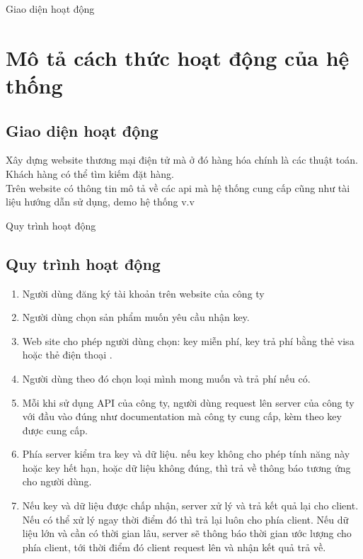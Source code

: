 \documentclass{beamer}
\begin{document}
\begin{frame}{Giao diện hoạt động}
\section{Mô tả cách thức hoạt động của hệ thống}
\subsection{Giao diện hoạt động}
Xây dựng website thương mại điện tử mà ở đó hàng hóa chính là các thuật toán. Khách hàng có thể tìm kiếm đặt hàng.\\

Trên website có thông tin mô tả về các api mà hệ thống cung cấp cũng như tài liệu hướng dẫn sử dụng, demo hệ thống v.v
\end{frame}
\begin{frame}{Quy trình hoạt động}
\subsection{Quy trình hoạt động}
\begin{enumerate}
\item Người dùng đăng ký tài khoản trên website của công ty
\item Người dùng chọn sản phẩm muốn yêu cầu nhận key.
\item Web site cho phép người dùng chọn: key miễn phí, key trả phí bằng thẻ visa hoặc thẻ điện thoại . 
\item Người dùng theo đó chọn loại mình mong muốn và trả phí nếu có.
\item Mỗi khi sử dụng API của công ty, người dùng request lên server của công ty với đầu vào đúng như documentation mà công ty cung cấp, kèm theo key được cung cấp.
\item Phía server  kiểm tra key và dữ liệu. nếu key không cho phép tính năng này hoặc key hết hạn, hoặc dữ liệu không đúng, thì trả về thông báo tương ứng cho người dùng.
\item Nếu key và dữ liệu được chấp nhận, server xử lý và trả kết quả lại cho client. Nếu có thể xử lý ngay thời điểm đó thì trả lại luôn cho phía client. Nếu dữ liệu lớn và cần có thời gian lâu, server sẽ thông báo thời gian ước lượng cho phía client, tới thời điểm đó client request lên và nhận kết quả trả về. 

\end{enumerate}

\end{frame}
\end{document}
